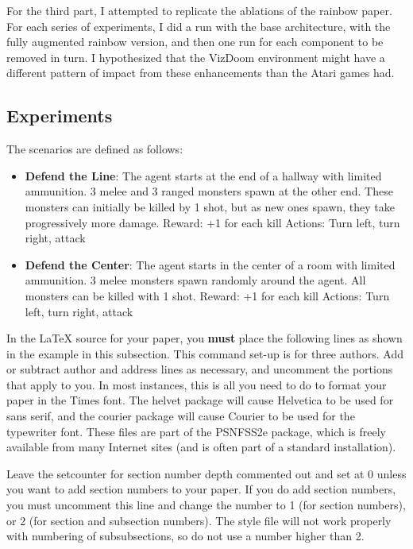 \documentclass[letterpaper]{article}
\begin{document}
	For the third part, I attempted to replicate the ablations of the rainbow paper. For each series of experiments, I did a run with the base architecture, with the fully augmented rainbow version, and then one run for each component to be removed in turn. I hypothesized that the VizDoom environment might have a different pattern of impact from these enhancements than the Atari games had. 
	 
	\subsection{Experiments}
	
	The scenarios are defined as follows:
	\begin{itemize}
		\item \textbf{Defend the Line}: The agent starts at the end of a hallway with limited ammunition. 3 melee and 3 ranged monsters spawn at the other end. These monsters can initially be killed by 1 shot, but as new ones spawn, they take progressively more damage.
		\subitem Reward: +1 for each kill
		\subitem Actions: Turn left, turn right, attack
		\item \textbf{Defend the Center}: The agent starts in the center of a room with limited ammunition. 3 melee monsters spawn randomly around the agent. All monsters can be killed with 1 shot.
		\subitem Reward: +1 for each kill
		\subitem Actions: Turn left, turn right, attack
	\end{itemize}
	
	In the \LaTeX{} source for your paper, you \textbf{must} place the following lines as shown in the example in this subsection. This command set-up is for three authors. Add or subtract author and address lines as necessary, and uncomment the portions that apply to you. In most instances, this is all you need to do to format your paper in the Times font. The helvet package will cause Helvetica to be used for sans serif, and the courier package will cause Courier to be used for the typewriter font. These files are part of the PSNFSS2e package, which is freely available from many Internet sites (and is often part of a standard installation).
	
	Leave the setcounter for section number depth commented out and set at 0 unless you want to add section numbers to your paper. If you do add section numbers, you must uncomment this line and change the number to 1 (for section numbers), or 2 (for section and subsection numbers). The style file will not work properly with numbering of subsubsections, so do not use a number higher than 2.
	
\end{document}
